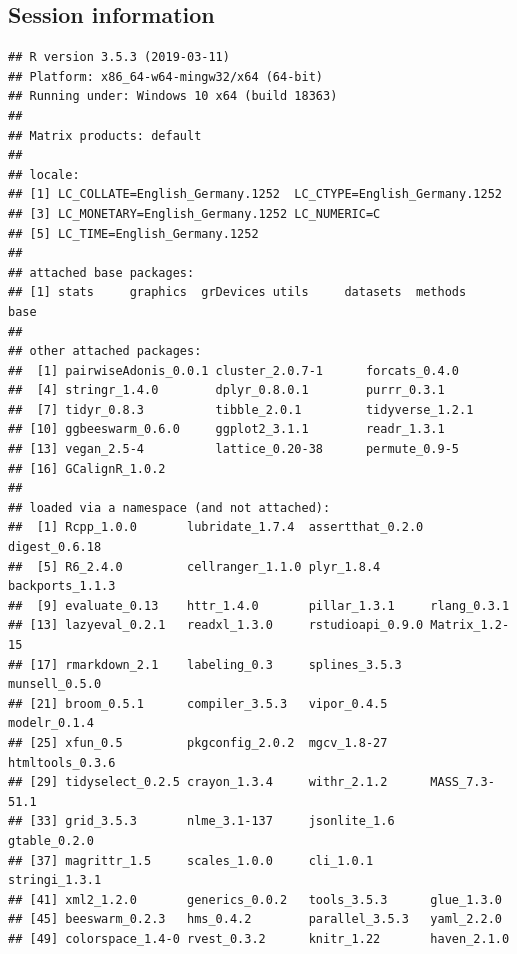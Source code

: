 \documentclass[]{article}
\begin{document}
\subsection{Session information}\label{session-information}

\begin{verbatim}
## R version 3.5.3 (2019-03-11)
## Platform: x86_64-w64-mingw32/x64 (64-bit)
## Running under: Windows 10 x64 (build 18363)
## 
## Matrix products: default
## 
## locale:
## [1] LC_COLLATE=English_Germany.1252  LC_CTYPE=English_Germany.1252   
## [3] LC_MONETARY=English_Germany.1252 LC_NUMERIC=C                    
## [5] LC_TIME=English_Germany.1252    
## 
## attached base packages:
## [1] stats     graphics  grDevices utils     datasets  methods   base     
## 
## other attached packages:
##  [1] pairwiseAdonis_0.0.1 cluster_2.0.7-1      forcats_0.4.0       
##  [4] stringr_1.4.0        dplyr_0.8.0.1        purrr_0.3.1         
##  [7] tidyr_0.8.3          tibble_2.0.1         tidyverse_1.2.1     
## [10] ggbeeswarm_0.6.0     ggplot2_3.1.1        readr_1.3.1         
## [13] vegan_2.5-4          lattice_0.20-38      permute_0.9-5       
## [16] GCalignR_1.0.2      
## 
## loaded via a namespace (and not attached):
##  [1] Rcpp_1.0.0       lubridate_1.7.4  assertthat_0.2.0 digest_0.6.18   
##  [5] R6_2.4.0         cellranger_1.1.0 plyr_1.8.4       backports_1.1.3 
##  [9] evaluate_0.13    httr_1.4.0       pillar_1.3.1     rlang_0.3.1     
## [13] lazyeval_0.2.1   readxl_1.3.0     rstudioapi_0.9.0 Matrix_1.2-15   
## [17] rmarkdown_2.1    labeling_0.3     splines_3.5.3    munsell_0.5.0   
## [21] broom_0.5.1      compiler_3.5.3   vipor_0.4.5      modelr_0.1.4    
## [25] xfun_0.5         pkgconfig_2.0.2  mgcv_1.8-27      htmltools_0.3.6 
## [29] tidyselect_0.2.5 crayon_1.3.4     withr_2.1.2      MASS_7.3-51.1   
## [33] grid_3.5.3       nlme_3.1-137     jsonlite_1.6     gtable_0.2.0    
## [37] magrittr_1.5     scales_1.0.0     cli_1.0.1        stringi_1.3.1   
## [41] xml2_1.2.0       generics_0.0.2   tools_3.5.3      glue_1.3.0      
## [45] beeswarm_0.2.3   hms_0.4.2        parallel_3.5.3   yaml_2.2.0      
## [49] colorspace_1.4-0 rvest_0.3.2      knitr_1.22       haven_2.1.0
\end{verbatim}
\end{document}
